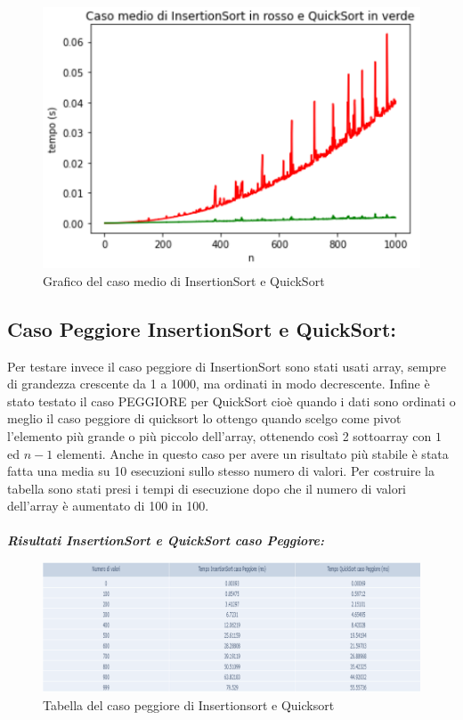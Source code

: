 \documentclass{article}
\begin{document}
\begin{figure}[H]
\centering
\includegraphics[width=.7\textwidth, height=.6\textheight, keepaspectratio]{CasoMedioGrafico}
\vspace{-5mm}
\caption{Grafico del caso medio di InsertionSort e QuickSort}
\label{fig:fig2}
\end{figure}

\subsection {Caso Peggiore InsertionSort e QuickSort:}
Per testare invece il caso peggiore di InsertionSort sono stati usati array, sempre di grandezza crescente  da 1 a 1000, ma ordinati in modo decrescente. Infine è stato testato il caso PEGGIORE per QuickSort cioè quando i dati sono ordinati o meglio il caso peggiore di quicksort lo ottengo quando scelgo come pivot l'elemento più grande o più piccolo dell'array, ottenendo così 2 sottoarray con $1$ ed $n-1$ elementi.
Anche in questo caso per avere un risultato più stabile è stata fatta una media su 10 esecuzioni sullo stesso numero di valori. Per costruire la tabella sono stati presi i tempi di esecuzione dopo che il numero di valori dell'array è aumentato di 100 in 100.  \\
\\
\textit{\bf{Risultati InsertionSort e QuickSort caso Peggiore:}} \\
\begin{figure}[h]
\centering
\includegraphics[width=\textwidth]{CasoPeggioreTabella}
\vspace{-5mm}
\caption{Tabella del caso peggiore di Insertionsort e Quicksort}
\label{fig:fig3}
\end{figure} \\
\end{document}

